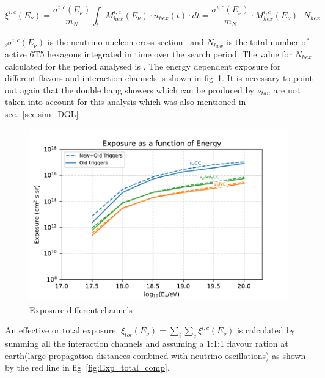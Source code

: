 \begin{equation}
  \xi^{i,c}(E_{\nu}) = \frac{\sigma^{i,c}(E_{\nu})}{m_N} \int_{t} M_{hex}^{i,c}(E_{\nu}) \cdot n_{hex}(t) \cdot dt =  \frac{\sigma^{i,c}(E_{\nu})}{m_N} \cdot M_{hex}^{i,c}(E_{\nu}) \cdot N_{hex}
\end{equation}

,$\sigma^{i,c}(E_{\nu})$ is the neutrino nucleon cross-section~\cite{Cooper-Sarkar:2011jtt} and $N_{hex}$ is the total number of active 6T5 hexagons integrated in time over the search period. The value for $N_{hex}$ calculated for the period analysed is . The energy dependent exposure for different flavors and interaction channels is shown in fig~\ref{fig:Exp_flavors_comp}. It is necessary to point out again that the double bang showers which can be produced by $\nu_{tau}$ are not taken into account for this analysis which was also mentioned in sec.~\ref{sec:sim_DGL} 

\begin{figure}[t!]
  \centering
  \includegraphics[width=14.5cm]{thesis_figures/ExpLimits/Exposure_comp_all_anotated_new_sim_optim.pdf}
  \caption{Exposure different channels}
  \label{fig:Exp_flavors_comp}
\end{figure}

An effective or total exposure, $\xi_{tot}(E_{\nu}) = \sum_{i}\sum_{c} \xi^{i,c}(E_{\nu})$ is calculated by summing all the interaction channels and assuming a 1:1:1 flavour ration at earth(large propagation distances combined with neutrino oscillations) as shown by the red line in fig~\ref{fig:Exp_total_comp}. 

